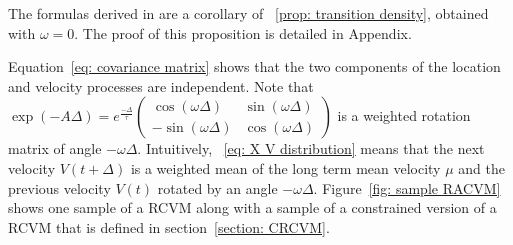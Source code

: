 \documentclass[11pt]{article}
\newcommand {\1}{\mathbb{1}}
\theoremstyle{definition}
\theoremstyle{remark}
\theoremstyle{remark}
\begin{document}
The formulas derived in \cite{johnson_continuoustime_2008} are a corollary of ~\ref{prop: transition density}, obtained with $\omega=0$. The proof of this proposition is detailed in Appendix.

Equation~\ref{eq: covariance matrix} shows that the two components of the location and velocity processes are independent.
Note that $\exp(-A\Delta)=e^{\frac{-\Delta}{\tau}} \begin{pmatrix} \cos(\omega \Delta) & \sin(\omega \Delta) \\ -\sin(\omega \Delta) & \cos(\omega \Delta) \end{pmatrix}$ is a weighted rotation matrix of angle $-\omega \Delta$.
Intuitively, ~\ref{eq: X V distribution} means that the next velocity $V(t+\Delta)$ is a weighted mean of the long term mean velocity $\mu$ and the previous velocity $V(t)$ rotated by an angle $-\omega \Delta$.
 Figure~\ref{fig: sample RACVM} shows one sample of a RCVM along with a sample of a constrained version of a RCVM that is defined in section~\ref{section: CRCVM}.\\


\end{document}
